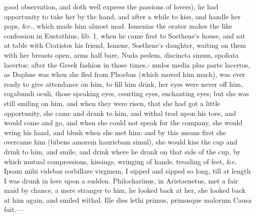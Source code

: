 {good observation, and doth well express the passions of lovers), he had
opportunity to take her by the hand, and after a while to kiss, and
handle her paps, \&c.,  which made him almost mad. Ismenias the
orator makes the like confession in Eustathius, lib. 1, when he came
first to Sosthene's house, and sat at table with Cratistes his friend,
Ismene, Sosthene's daughter, waiting on them with her breasts open,
arms half bare, Nuda pedem, discincta sinum, spoliata lacertos;
after the Greek fashion in those times,- nudos media plus parte
lacertos, as Daphne was when she fled from Phoebus (which moved him
much), was ever ready to give attendance on him, to fill him drink, her
eyes were never off him, rogabundi oculi, those speaking eyes, courting
eyes, enchanting eyes; but she was still smiling on him, and when they
were risen, that she had got a little opportunity, she came and
drank to him, and withal trod upon his toes, and would come and go, and
when she could not speak for the company, she would wring his hand, and
blush when she met him: and by this means first she overcame him
(bibens amorem hauriebam simul), she would kiss the cup and drink to
him, and smile, and drink where he drank on that side of the cup, by
which mutual compressions, kissings, wringing of hands, treading of
feet, \&c. Ipsam mihi videbar sorbillare virginem, I sipped and sipped
so long, till at length I was drunk in love upon a sudden.
Philocharinus, in  Aristaenetus, met a fair maid by chance, a
mere stranger to him, he looked back at her, she looked back at him
again, and smiled withal.
Ille dies lethi primus, primusque malorum
Causa fuit.---

}

